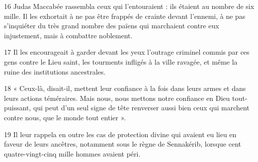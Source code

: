 
16 Judas Maccabée rassembla ceux qui l’entouraient : ils étaient au nombre de six mille. Il les exhortait à ne pas être frappés de crainte devant l’ennemi, à ne pas s’inquiéter du très grand nombre des païens qui marchaient contre eux injustement, mais à combattre noblement.

17 Il les encourageait à garder devant les yeux l’outrage criminel commis par ces gens contre le Lieu saint, les tourments infligés à la ville ravagée, et même la ruine des institutions ancestrales.

18 « Ceux-là, disait-il, mettent leur confiance à la fois dans leurs armes et dans leurs actions téméraires. Mais nous, nous mettons notre confiance en Dieu tout-puissant, qui peut d’un seul signe de tête renverser aussi bien ceux qui marchent contre nous, que le monde tout entier ».

19 Il leur rappela en outre les cas de protection divine qui avaient eu lieu en faveur de leurs ancêtres, notamment sous le règne de Sennakérib, lorsque cent quatre-vingt-cinq mille hommes avaient péri.
